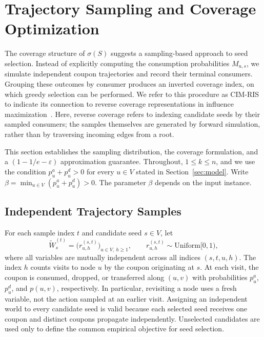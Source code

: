 \documentclass[sigconf]{acmart}
\newcommand{\CIMRIS}{\textsc{CIM-RIS}}
\begin{document}
\section{Trajectory Sampling and Coverage Optimization}
\label{sec:algo}

The coverage structure of $\sigma(S)$ suggests a sampling-based approach
to seed selection. Instead of explicitly computing the consumption
probabilities $M_{u,s}$, we simulate independent coupon trajectories and
record their terminal consumers. Grouping these outcomes by consumer
produces an inverted coverage index, on which greedy selection can be
performed. We refer to this procedure as \CIMRIS{} to indicate its
connection to reverse coverage representations in influence
maximization~\cite{borgs2014maximizing,tang2015influence}.
Here, reverse coverage refers to indexing candidate seeds by their
sampled consumers; the samples themselves are generated by forward
simulation, rather than by traversing incoming edges from a root.

This section establishes the sampling distribution, the coverage
formulation, and a $(1-1/e-\varepsilon)$ approximation guarantee.
Throughout, $1\le k\le n$, and we use the condition
$p_u^a+p_u^d>0$ for every $u\in V$ stated in
Section~\ref{sec:model}. Write
$\beta=\min_{u\in V}(p_u^a+p_u^d)>0$.
The parameter $\beta$ depends on the input instance.

\subsection{Independent Trajectory Samples}
\label{sec:source-worlds}

For each sample index $t$ and candidate seed $s\in V$, let
\[
  \widetilde W_s^{(t)}
  =\bigl(r_{u,h}^{(s,t)}\bigr)_{u\in V,\ h\ge1},
  \qquad r_{u,h}^{(s,t)}\sim\mathrm{Uniform}[0,1),
\]
where all variables are mutually independent across all indices
$(s,t,u,h)$. The index $h$ counts visits to node $u$ by the coupon
originating at $s$. At each visit, the coupon is consumed, dropped,
or transferred along $(u,v)$ with probabilities $p_u^a$, $p_u^d$,
and $p(u,v)$, respectively. In particular, revisiting a node uses
a fresh variable, not the action sampled at an earlier visit.
Assigning an independent world to every candidate seed is valid
because each selected seed receives one coupon and distinct coupons
propagate independently. Unselected candidates are used only to
define the common empirical objective for seed selection.
\end{document}
